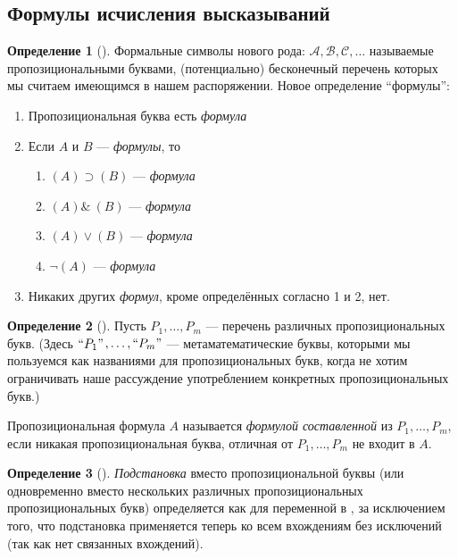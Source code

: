 \documentclass[a4paper, 12pt]{article}  %
\DeclareMathOperator{\conj}{\mathbb{\&}}
\theoremstyle{definition}
\newtheorem*{definition}{Определение}
\begin{document}
	\subsection*{Формулы исчисления высказываний}
	
	\begin{definition}[]
		Формальные символы нового рода: $\mathscr{A}, \mathscr{B}, \mathscr{C}, \dots$ называемые
		пропозициональными буквами, (потенциально) бесконечный перечень которых мы считаем
		имеющимся в нашем распоряжении. Новое определение ``формулы'': 
		\begin{enumerate}
			\setlength\itemsep{-3pt}	
			\item Пропозициональная буква есть \textit{формула}
			\item Если $A$ и $B$ --- \textit{формулы}, то
			\begin{multicols}{3}
				\begin{enumerate}
					\item $(A) \supset (B)$ --- \textit{формула}
					\item $(A) \conj\: (B)$ --- \textit{формула}
					\item $(A) \vee (B)$    --- \textit{формула}
					\item $\neg (A)$        --- \textit{формула}
				\end{enumerate}
			\end{multicols}
			\item Никаких других \textit{формул}, кроме определённых согласно 1 и 2, нет.
		\end{enumerate}
	\end{definition}

	\begin{definition}[]
		Пусть $P_1, \dots, P_m$ --- перечень различных пропозициональных букв. (Здесь 
		$``P_1"$$ , \dots, ``P_m"$ --- метаматематические буквы, которыми мы пользуемся как
		названиями для пропозициональных букв, когда не хотим ограничивать наше рассуждение
		употреблением конкретных пропозициональных букв.)
		
		Пропозициональная формула $A$ называется \textit{формулой составленной} из 
		$P_1, \dots, P_m$, если никакая пропозициональная буква, отличная от $P_1, \dots, P_m$ 
		не входит в $A$.
	\end{definition}

	\begin{definition}[]
		\textit{Подстановка} вместо пропозициональной буквы (или одновременно вместо
		нескольких различных пропозициональных пропозициональных букв) определяется как для
		переменной в , за исключением того, что подстановка применяется теперь
		ко всем вхождениям без исключений (так как нет связанных вхождений).
	\end{definition}
\end{document}
